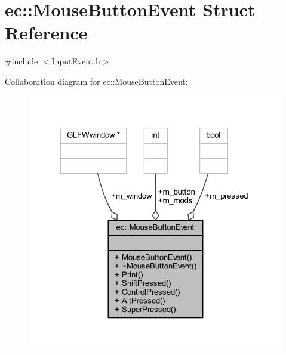 \hypertarget{structec_1_1_mouse_button_event}{}\section{ec\+:\+:Mouse\+Button\+Event Struct Reference}
\label{structec_1_1_mouse_button_event}


{\ttfamily \#include $<$Input\+Event.\+h$>$}



Collaboration diagram for ec\+:\+:Mouse\+Button\+Event\+:\nopagebreak
\begin{figure}[H]
\begin{center}
\leavevmode
\includegraphics[width=317pt]{structec_1_1_mouse_button_event__coll__graph}
\end{center}
\end{figure}
